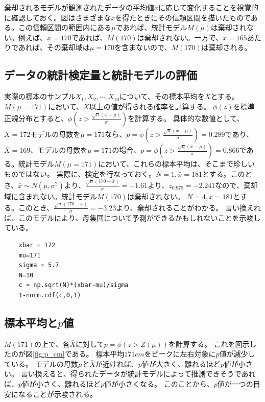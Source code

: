 棄却されるモデルが観測されたデータの平均値$\bar{x}$に応じて変化することを視覚的に確認しておく。図はさまざまな$\bar{x}$を得たときにその信頼区間を描いたものである。この信頼区間の範囲内にある$\mu$であれば、統計モデル$M(\mu)$は棄却されない。例えば、$\bar{x}=170$であれば、$M(170)$は棄却されない。一方で、$\bar{x}=165$あたりであれば、その棄却域は$\mu=170$を含まないので、$M(170)$は棄却される。


\subsection{データの統計検定量と統計モデルの評価}
実際の標本のサンプル$X_1,X_2,\cdots,X_{10}$について、その標本平均を$\bar{X}$とする。$M(\mu=171)$において、$\bar{X}$以上の値が得られる確率を計算する。
$\phi(z)$を標準正規分布とすると、$\phi(z>\frac{\sqrt{n}(\bar{x}-\mu)}{\sigma})$を計算する。
具体的な数値として、
$\bar{X}=172$モデルの母数を$\mu=171$なら、$p=\phi(z>\frac{\sqrt{n}(\bar{x}-\mu)}{\sigma}) = 0.289$であり、$\bar{X}=169$、モデルの母数を$\mu=171$の場合、$p=\phi(z>\frac{\sqrt{n}(\bar{x}-\mu)}{\sigma}) = 0.866$である。統計モデル$M(\mu=171)$において、これらの標本平均は、そこまで珍しいものではない。
実際に、検定を行なっておく。$N=1,\bar{x}=181$とする。このとき、$\bar{x}\sim N(\mu,\sigma^2)$より、$\frac{\sqrt{n}(170-\bar{x})}{\sigma}=-1.61$より、$z_{0.975}=-2.241$なので、棄却域に含まれない。統計モデル$M(170)$は棄却されない。
$N=4,\bar{x}=181$とする。このとき、$\frac{\sqrt{n}(170-\bar{x})}{\sigma}=-3.23$より、棄却されることがわかる。
\fi
言い換えれば、このモデルにより、母集団について予測ができるかもしれないことを示唆している。

\begin{lstlisting}
    xbar = 172
    mu=171
    sigma = 5.7
    N=10
    c = np.sqrt(N)*(xbar-mu)/sigma
    1-norm.cdf(c,0,1)
\end{lstlisting}

\subsection{標本平均と$p$値}
$M(171)$の上で、各$\bar{X}$に対して$p=\phi(z>Z(\mu))$を計算する。
これを図示したのが図\ref{fig:p_cm}である。
標本平均$171cm$をピークに左右対象に$p$値が減少している。
モデルの母数$\mu$と$\bar{X}$が近ければ、$p$値が大きく、離れるほど$p$値が小さい。
言い換えると、得られたデータが統計モデルによって推測できそうであれば、$p$値が小さく、離れるほど$p$値が小さくなる。
このことから、$p$値が一つの目安になることが示唆される。

